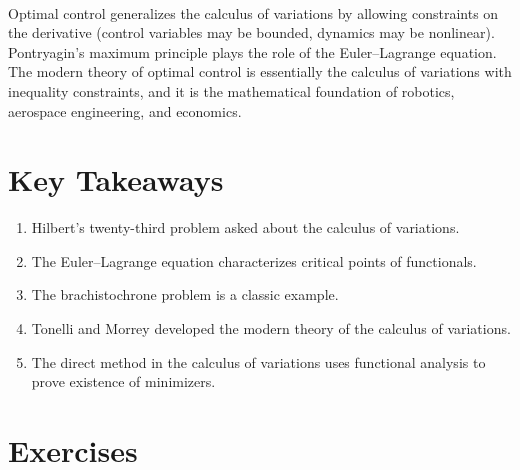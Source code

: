 \begin{description}[font=\bfseries, leftmargin=2em, style=nextline]
\item[Q: How does the calculus of variations connect to optimal control?]\hfill\\
Optimal control generalizes the calculus of variations by allowing constraints on the derivative (control variables may be bounded, dynamics may be nonlinear). Pontryagin's maximum principle plays the role of the Euler--Lagrange equation. The modern theory of optimal control is essentially the calculus of variations with inequality constraints, and it is the mathematical foundation of robotics, aerospace engineering, and economics.

\end{description}

\section*{Key Takeaways}

\begin{enumerate}
    \item Hilbert's twenty-third problem asked about the calculus of variations.
    \item The Euler--Lagrange equation characterizes critical points of functionals.
    \item The brachistochrone problem is a classic example.
    \item Tonelli and Morrey developed the modern theory of the calculus of variations.
    \item The direct method in the calculus of variations uses functional analysis to prove existence of minimizers.
\end{enumerate}

\section*{Exercises}

